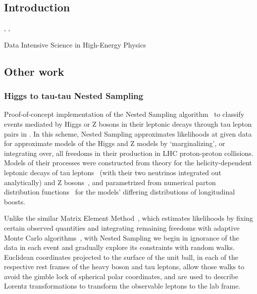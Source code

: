 \setcounter{chapter}{-1}
\begin{singlespacing}
\chapter{Introduction}
\label{chapter:introduction}
%
\begin{epigraphs}
\qitem{%
\TODO{}}%
{\TODO{},
\textit{\TODO{}},
\TODO{}}
\end{epigraphs}
\end{singlespacing}

Data Intensive Science in High-Energy Physics

\section{Other work}

\subsection{Higgs to tau-tau Nested Sampling}
Proof-of-concept implementation of the Nested Sampling algorithm~\cite{
skilling2004nested,
skilling2006nested,
skilling2010foundations
}
to classify events mediated by Higgs or Z bosons in their leptonic decays
through tau lepton pairs in \atlas.
In this scheme, Nested Sampling approximates likelihoods at given data for
approximate models of the Higgs and Z models by `marginalizing',
or integrating over, all freedoms in their production in LHC proton-proton
collisions.
Models of their processes were constructed from theory for the
helicity-dependent leptonic decays of tau leptons~\cite{Hays2014tau}
(with their two neutrinos integrated out analytically)
and Z bosons~\cite{Thomson2011EWK},
and parametrized from numerical parton distribution
functions~\cite{Buckley:2014ana} for the models' differing distributions of
longitudinal boosts.

Unlike the similar Matrix Element Method~\cite{
Fiedler:2010sg,
Gainer:2013iya,
PhysRevD.83.074010
},
which estimates likelihoods by fixing certain observed quantities and
integrating remaining freedoms with adaptive Monte Carlo algorithms~\cite{
Fiedler:2010sg,
Gainer:2013iya,
Lepage:1977sw,
Ohl:1998jn
},
with Nested Sampling we begin in ignorance of the data in each event and
gradually explore its constraints with random walks.
Euclidean coordinates projected to the surface of the unit ball,
in each of the respective rest frames of the heavy boson and tau leptons, allow
those walks to avoid the gimble lock of spherical polar coordinates, and are
used to describe Lorentz transformations to transform the observable leptons
to the lab frame.

